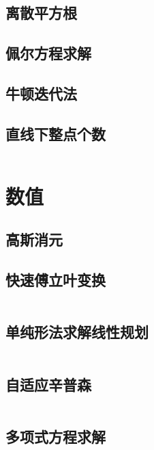 \documentclass[a4paper]{article}
\newcommand{\cppcode}[1]{
    \inputminted[mathescape]{cpp}{source/#1}
}
\begin{document}
\subsection{离散平方根}

\subsection{佩尔方程求解}

\subsection{牛顿迭代法}

\subsection{直线下整点个数}

\cppcode{number-theory/lattice-count.cpp}

\section{数值}

\subsection{高斯消元}

\subsection{快速傅立叶变换}

\cppcode{numerical-algorithm/fast-fourier-transform.cpp}

\subsection{单纯形法求解线性规划}

\cppcode{numerical-algorithm/linear-programming-simplex.cpp}

\subsection{自适应辛普森}

\cppcode{numerical-algorithm/adaptive-simpson.cpp}

\subsection{多项式方程求解}
\end{document}
